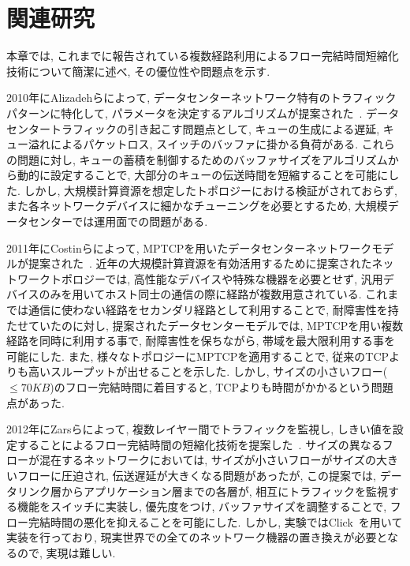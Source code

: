 \documentclass[10pt, a4paper, twocolumn]{jsarticle}
\begin{document}

\section{関連研究}
\label{sec:related}
本章では, これまでに報告されている複数経路利用によるフロー完結時間短縮化技術について簡潔に述べ, その優位性や問題点を示す.

2010年にAlizadehらによって, データセンターネットワーク特有のトラフィックパターンに特化して,
パラメータを決定するアルゴリズムが提案された~\cite{dctcp}.
データセンタートラフィックの引き起こす問題点として, キューの生成による遅延, キュー溢れによるパケットロス,
スイッチのバッファに掛かる負荷がある.
これらの問題に対し, キューの蓄積を制御するためのバッファサイズをアルゴリズムから動的に設定することで,
大部分のキューの伝送時間を短縮することを可能にした.
しかし, 大規模計算資源を想定したトポロジーにおける検証がされておらず, また各ネットワークデバイスに細かなチューニングを必要とするため,
大規模データセンターでは運用面での問題がある.

2011年にCostinらによって, MPTCPを用いたデータセンターネットワークモデルが提案された~\cite{improving}.
近年の大規模計算資源を有効活用するために提案されたネットワークトポロジーでは,
高性能なデバイスや特殊な機器を必要とせず, 汎用デバイスのみを用いてホスト同士の通信の際に経路が複数用意されている.
これまでは通信に使わない経路をセカンダリ経路として利用することで, 耐障害性を持たせていたのに対し, 提案されたデータセンターモデルでは,
MPTCPを用い複数経路を同時に利用する事で, 耐障害性を保ちながら, 帯域を最大限利用する事を可能にした.
また, 様々なトポロジーにMPTCPを適用することで, 従来のTCPよりも高いスループットが出せることを示した.
しかし, サイズの小さいフロー($\leq70KB$)のフロー完結時間に着目すると, TCPよりも時間がかかるという問題点があった.

2012年にZarsらによって, 複数レイヤー間でトラフィックを監視し,
しきい値を設定することによるフロー完結時間の短縮化技術を提案した~\cite{detail}.
サイズの異なるフローが混在するネットワークにおいては, サイズが小さいフローがサイズの大きいフローに圧迫され,
伝送遅延が大きくなる問題があったが, この提案では, データリンク層からアプリケーション層までの各層が, 相互にトラフィックを監視する機能をスイッチに実装し,
優先度をつけ, バッファサイズを調整することで, フロー完結時間の悪化を抑えることを可能にした.
しかし, 実験ではClick~\cite{click}を用いて実装を行っており, 現実世界での全てのネットワーク機器の置き換えが必要となるので, 実現は難しい.
\end{document}
